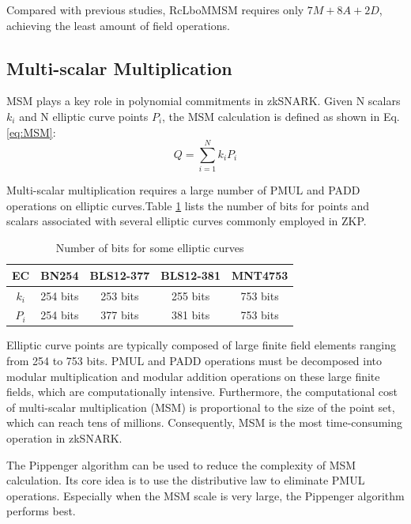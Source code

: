 \documentclass[conference]{IEEEtran}
\begin{document}
Compared with previous studies, RcLboMMSM requires only $7M + 8A + 2D$, achieving the least amount of field operations.

\subsection{Multi-scalar Multiplication}

MSM plays a key role in polynomial commitments in zkSNARK. Given N scalars $k_i$ and N elliptic curve points $P_i$, the MSM calculation is defined as shown in Eq. \eqref{eq:MSM}:
\begin{equation}
    \label{eq:MSM}
    Q=\sum_{i=1}^Nk_iP_i
\end{equation}

Multi-scalar multiplication requires a large number of PMUL and PADD operations on elliptic curves.Table \ref{tab:elliptic-curves-bits} lists the number of bits for points and scalars associated with several elliptic curves commonly employed in ZKP.

\begin{table}[htbp]
    \label{tab:elliptic-curves-bits}
    \centering
    \caption{Number of bits for some elliptic curves}
    \begin{tabular}{c|c|c|c|c}
    \toprule
    \textbf{EC} & \textbf{BN254} & \textbf{BLS12-377} & \textbf{BLS12-381} & \textbf{MNT4753} \\
    \midrule
    $k_i$ & 254 bits & 253 bits & 255 bits & 753 bits \\
    $P_i$ & 254 bits & 377 bits & 381 bits & 753 bits \\
    \bottomrule
    \end{tabular}
    \label{tab:elliptic-curves-bits}
\end{table}

Elliptic curve points are typically composed of large finite field elements ranging from 254 to 753 bits. PMUL and PADD operations must be decomposed into modular multiplication and modular addition operations on these large finite fields, which are computationally intensive. Furthermore, the computational cost of multi-scalar multiplication (MSM) is proportional to the size of the point set, which can reach tens of millions. Consequently, MSM is the most time-consuming operation in zkSNARK.

The Pippenger algorithm can be used to reduce the complexity of MSM calculation. Its core idea is to use the distributive law to eliminate PMUL operations. Especially when the MSM scale is very large, the Pippenger algorithm performs best.
\end{document}
